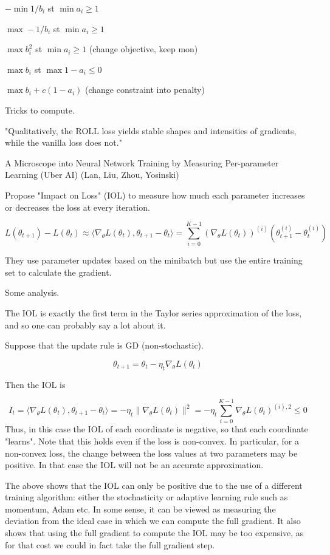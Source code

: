 \documentclass[english]{article}
\begin{document}
$-\min 1/b_i$ st $\min a_i\ge 1$

$\max - 1/b_i$ st $\min a_i\ge 1$

$\max b_i^2$ st $\min  a_i\ge 1$ (change objective, keep mon)

$\max b_i$ st $\max 1-a_i \le 0$ 

$\max b_i + c(1-a_i)$ (change constraint into penalty)


Tricks to compute. 

"Qualitatively, the ROLL loss yields stable shapes
and intensities of gradients, while the vanilla loss does not."


\item A Microscope into Neural Network
Training by Measuring Per-parameter Learning (Uber AI) (Lan, Liu, Zhou, Yosinski)

Propose "Impact on
Loss" (IOL) to measure how much each
parameter increases or decreases the loss at
every iteration.

$$L(\theta_{t+1} ) - L(\theta_{t} ) \approx 
\langle\nabla_\theta L(\theta_{t} ), \theta_{t+1} - \theta_{t} 
\rangle
=
\sum_{i=0}^{K-1}
(\nabla_\theta L(\theta_{t} ))^{(i)} (\theta
^{(i)}_{t+1}
- \theta^{(i)}_t)
$$

They use parameter updates based on the minibatch but use the entire training set to
calculate the gradient.


Some analysis.

The IOL is exactly the first term in the Taylor series approximation of the loss, and so one can probably say a lot about it. 

Suppose that the update rule is GD (non-stochastic). 

$$\theta_{t+1} = \theta_{t} - \eta_t \nabla_\theta L(\theta_{t})$$

Then the IOL is 

$$I_t = 
\langle\nabla_\theta L(\theta_{t} ), \theta_{t+1} - \theta_{t} 
\rangle
=
- \eta_t 
\|\nabla_\theta L(\theta_{t} )\|^2
=
- \eta_t\sum_{i=0}^{K-1}
\nabla_\theta L(\theta_{t} )^{(i),2}\le 0
$$
Thus, in this case the IOL of each coordinate is negative, so that each coordinate "learns". Note that this holds even if the loss is non-convex. In particular, for a non-convex loss, the change between the loss values at two parameters may be positive. In that case the IOL will not be an accurate approximation.

The above shows that the IOL can only be positive due to the use of a different training algorithm: either the stochasticity or adaptive learning rule such as momentum, Adam etc. In some sense, it can be viewed as measuring the deviation from the ideal case in which we can compute the full gradient. It also shows that using the full gradient to compute the IOL may be too expensive, as for that cost we could in fact take the full gradient step. 
\end{document}
